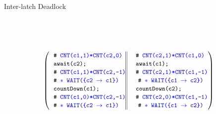 \begin{frame}{Inter-latch Deadlock}
\begin{small}
\begin{center}
\\
  \\
\\
\[
{
\left(
\begin{tabular}{ l@{\extracolsep{\fill}}  || l@{\extracolsep{\fill}} }
\CSPEC{CNT(c1,1){\sep}CNT(c2,0)} &~~\CSPEC{CNT(c2,1){\sep}CNT(c1,0)}\\
\code{await(c2);~~} &~~\code{await(c1);}\\
\CSPEC{CNT(c1,1){\sep}CNT(c2,-1)} &~~\CSPEC{CNT(c2,1){\sep}CNT(c1,-1)}\\
\CSPEC{$\ast$ WAIT(\{c2 $\rightarrow$ c1\})} &~~ \CSPEC{$\ast$ WAIT(\{c1 $\rightarrow$ c2\})}\\
\code{countDown(c1);~~} &~~\code{countDown(c2);}\\
\CSPEC{CNT(c1,0){\sep}CNT(c2,-1)} &~~\CSPEC{CNT(c2,0){\sep}CNT(c1,-1)}\\
\CSPEC{$\ast$ WAIT(\{c2 $\rightarrow$ c1\})} &~~ \CSPEC{$\ast$ WAIT(\{c1 $\rightarrow$ c2\})}\\
\end{tabular}\right)%
}
\]

 \\ 

\end{center}
\end{small}
\end{frame}


